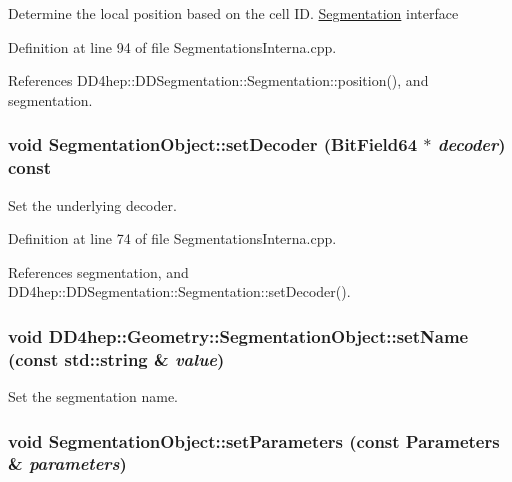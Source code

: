 Determine the local position based on the cell ID. \hyperlink{class_d_d4hep_1_1_geometry_1_1_segmentation}{Segmentation} interface 

Definition at line 94 of file SegmentationsInterna.cpp.

References DD4hep::DDSegmentation::Segmentation::position(), and segmentation.\hypertarget{class_d_d4hep_1_1_geometry_1_1_segmentation_object_a537aadc3926ed058ac98d8c6fae2d3fb}{
\subsubsection[{setDecoder}]{\setlength{\rightskip}{0pt plus 5cm}void SegmentationObject::setDecoder (BitField64 $\ast$ {\em decoder}) const}}
\label{class_d_d4hep_1_1_geometry_1_1_segmentation_object_a537aadc3926ed058ac98d8c6fae2d3fb}


Set the underlying decoder. 

Definition at line 74 of file SegmentationsInterna.cpp.

References segmentation, and DD4hep::DDSegmentation::Segmentation::setDecoder().\hypertarget{class_d_d4hep_1_1_geometry_1_1_segmentation_object_a41dcfab1ad8b2e330cb8a4c239026a17}{
\subsubsection[{setName}]{\setlength{\rightskip}{0pt plus 5cm}void DD4hep::Geometry::SegmentationObject::setName (const std::string \& {\em value})}}
\label{class_d_d4hep_1_1_geometry_1_1_segmentation_object_a41dcfab1ad8b2e330cb8a4c239026a17}


Set the segmentation name. \hypertarget{class_d_d4hep_1_1_geometry_1_1_segmentation_object_a8246875bc5c3dd4c4613bf56350690da}{
\subsubsection[{setParameters}]{\setlength{\rightskip}{0pt plus 5cm}void SegmentationObject::setParameters (const {\bf Parameters} \& {\em parameters})}}
\label{class_d_d4hep_1_1_geometry_1_1_segmentation_object_a8246875bc5c3dd4c4613bf56350690da}


